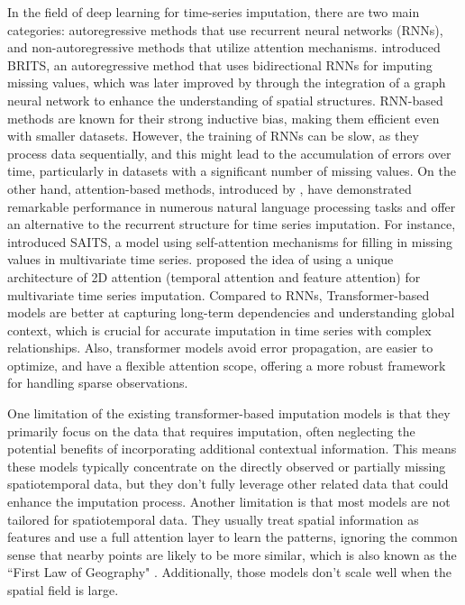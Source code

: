\documentclass[review]{elsarticle}
\begin{document}
 In the field of deep learning for time-series imputation, there are two main categories: autoregressive methods that use recurrent neural networks (RNNs), and non-autoregressive methods that utilize attention mechanisms. \citet{cao2018brits} introduced BRITS, an autoregressive method that uses bidirectional RNNs for imputing missing values, which was later improved by \citet{cini2021filling} through the integration of a graph neural network to enhance the understanding of spatial structures. RNN-based methods are known for their strong inductive bias, making them efficient even with smaller datasets. However, the training of RNNs can be slow, as they process data sequentially, and this might lead to the accumulation of errors over time, particularly in datasets with a significant number of missing values. On the other hand, attention-based methods, introduced by \citet{vaswani2017attention}, have demonstrated remarkable performance in numerous natural language processing tasks and offer an alternative to the recurrent structure for time series imputation. For instance, \citet{du2023saits} introduced SAITS, a model using self-attention mechanisms for filling in missing values in multivariate time series. \citet{tashiro2021csdi} proposed the idea of using a unique architecture of 2D attention (temporal attention and feature attention) for multivariate time series imputation. Compared to RNNs, Transformer-based models are better at capturing long-term dependencies and understanding global context, which is crucial for accurate imputation in time series with complex relationships. Also, transformer models avoid error propagation, are easier to optimize, and have a flexible attention scope, offering a more robust framework for handling sparse observations. 


One limitation of the existing transformer-based imputation models is that they primarily focus on the data that requires imputation, often neglecting the potential benefits of incorporating additional contextual information. This means these models typically concentrate on the directly observed or partially missing spatiotemporal data, but they don't fully leverage other related data that could enhance the imputation process. Another limitation is that most models are not tailored for spatiotemporal data. They usually treat spatial information as features and use a full attention layer to learn the patterns, ignoring the common sense that nearby points are likely to be more similar, which is also known as the ``First Law of Geography" \citep{tobler1970computer}. Additionally, those models don't scale well when the spatial field is large.
\end{document}
